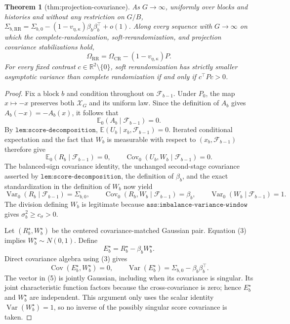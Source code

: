\documentclass{article}
\newtheorem{theorem}{Theorem}
\begin{document}
\begin{theorem}[thm:projection-covariance]\label{thm:projection-covariance}
As \(G\to\infty\), uniformly over blocks and histories and without any restriction on \(G/B\), \(\Sigma_{b,\mathrm{RR}}=\Sigma_{b,0}-(1-v_{\eta,\kappa})\beta_b\beta_b^\top+o(1)\). Along every sequence with \(G\to\infty\) on which the complete-randomization, soft-rerandomization, and projection covariance stabilizations hold,
\[
\Omega_{\mathrm{RR}}=\Omega_{\mathrm{CR}}-(1-v_{\eta,\kappa})P.
\]
For every fixed contrast \(c\in\mathbb R^2\setminus\{0\}\), soft rerandomization has strictly smaller asymptotic variance than complete randomization if and only if \(c^\top Pc>0\).
\end{theorem}
\begin{proof}
Fix a block \(b\) and condition throughout on \(\mathcal F_{b-1}\). Under \(P_0\), the map \(x\mapsto-x\) preserves both \(\mathcal X_G\) and its uniform law. Since the definition of \(A_b\) gives \(A_b(-x)=-A_b(x)\), it follows that
\[
\mathbb E_0(A_b\mid\mathcal F_{b-1})=0.                                      \tag{1}
\]
By \(\texttt{lem:score-decomposition}\),
\(\mathbb E(U_b\mid x_b,\mathcal F_{b-1})=0\). Iterated conditional expectation and the fact that \(W_b\) is measurable with respect to \((x_b,\mathcal F_{b-1})\) therefore give
\[
\mathbb E_0(R_b\mid\mathcal F_{b-1})=0,
\qquad
\operatorname{Cov}_0(U_b,W_b\mid\mathcal F_{b-1})=0.                         \tag{2}
\]
The balanced-sign covariance identity, the unchanged second-stage covariance asserted by \(\texttt{lem:score-decomposition}\), the definition of \(\beta_b\), and the exact standardization in the definition of \(W_b\) now yield
\[
\operatorname{Var}_0(R_b\mid\mathcal F_{b-1})=\Sigma_{b,0},
\qquad
\operatorname{Cov}_0(R_b,W_b\mid\mathcal F_{b-1})=\beta_b,
\qquad
\operatorname{Var}_0(W_b\mid\mathcal F_{b-1})=1.                            \tag{3}
\]
The division defining \(W_b\) is legitimate because \(\texttt{ass:imbalance-variance-window}\) gives \(\sigma_b^2\geq c_\sigma>0\).

Let \((R_b^\star,W_b^\star)\) be the centered covariance-matched Gaussian pair. Equation (3) implies \(W_b^\star\sim N(0,1)\). Define
\[
E_b^\star=R_b^\star-\beta_bW_b^\star.                                      \tag{4}
\]
Direct covariance algebra using (3) gives
\[
\operatorname{Cov}(E_b^\star,W_b^\star)=0,
\qquad
\operatorname{Var}(E_b^\star)=\Sigma_{b,0}-\beta_b\beta_b^\top.            \tag{5}
\]
The vector in (5) is jointly Gaussian, including when its covariance is singular. Its joint characteristic function factors because the cross-covariance is zero; hence \(E_b^\star\) and \(W_b^\star\) are independent. This argument only uses the scalar identity \(\operatorname{Var}(W_b^\star)=1\), so no inverse of the possibly singular score covariance is taken.


\end{proof}
\end{document}
